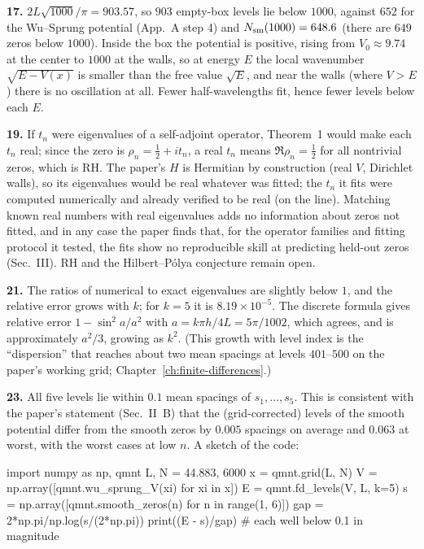 \textbf{17.} $2L\sqrt{1000}/\pi=903.57$, so $903$ empty-box levels lie below $1000$, against $652$ for the Wu--Sprung potential (App.~A step 4) and $N_{\mathrm{sm}}(1000)=648.6$ (there are $649$ zeros below $1000$). Inside the box the potential is positive, rising from $V_0\approx9.74$ at the center to $1000$ at the walls, so at energy $E$ the local wavenumber $\sqrt{E-V(x)}$ is smaller than the free value $\sqrt E$, and near the walls (where $V>E$) there is no oscillation at all. Fewer half-wavelengths fit, hence fewer levels below each $E$.

\textbf{19.} If $t_n$ were eigenvalues of a self-adjoint operator, Theorem~1 would make each $t_n$ real; since the zero is $\rho_n=\tfrac12+it_n$, a real $t_n$ means $\Re\rho_n=\tfrac12$ for all nontrivial zeros, which is RH. The paper's $H$ is Hermitian by construction (real $V$, Dirichlet walls), so its eigenvalues would be real whatever was fitted; the $t_n$ it fits were computed numerically and already verified to be real (on the line). Matching known real numbers with real eigenvalues adds no information about zeros not fitted, and in any case the paper finds that, for the operator families and fitting protocol it tested, the fits show no reproducible skill at predicting held-out zeros (Sec.~III). RH and the Hilbert--P\'olya conjecture remain open.

\textbf{21.} The ratios of numerical to exact eigenvalues are slightly below $1$, and the relative error grows with $k$; for $k=5$ it is $8.19\times10^{-5}$. The discrete formula gives relative error $1-\sin^2a/a^2$ with $a=k\pi h/4L=5\pi/1002$, which agrees, and is approximately $a^2/3$, growing as $k^2$. (This growth with level index is the ``dispersion'' that reaches about two mean spacings at levels $401$--$500$ on the paper's working grid; Chapter~\ref{ch:finite-differences}.)

\textbf{23.} All five levels lie within $0.1$ mean spacings of $s_1,\dots,s_5$. This is consistent with the paper's statement (Sec.~II~B) that the (grid-corrected) levels of the smooth potential differ from the smooth zeros by $0.005$ spacings on average and $0.063$ at worst, with the worst cases at low $n$. A sketch of the code:
\begin{pycode}
import numpy as np, qmnt
L, N = 44.883, 6000
x = qmnt.grid(L, N)
V = np.array([qmnt.wu_sprung_V(xi) for xi in x])
E = qmnt.fd_levels(V, L, k=5)
s = np.array([qmnt.smooth_zeros(n) for n in range(1, 6)])
gap = 2*np.pi/np.log(s/(2*np.pi))
print((E - s)/gap)        # each well below 0.1 in magnitude
\end{pycode}

